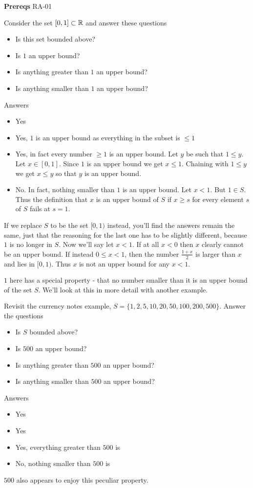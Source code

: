 

\textbf{Prereqs} RA-01

Consider the set $[0, 1] \subset \mathbb{R}$ and answer these questions
\begin{itemize}
	\item Is this set bounded above?
	\item Is $1$ an upper bound?
	\item Is anything greater than $1$ an upper bound?
	\item Is anything smaller than $1$ an upper bound?
\end{itemize}

Answers
\begin{itemize}
	\item Yes
	\item Yes, $1$ is an upper bound as everything in the subset is $\leq 1$
	\item Yes, in fact every number $\geq 1$ is an upper bound. Let $y$ be such that $1 \leq y$. Let $x \in [0, 1]$. Since $1$ is an upper bound we get $x \leq 1$. Chaining with $1 \leq y$ we get $x \leq y$ so that $y$ is an upper bound.
	\item No. In fact, nothing smaller than $1$ is an upper bound. Let $x < 1$. But $1 \in S$. Thus the definition that $x$ is an upper bound of $S$ if $x \geq s$ for every element $s$ of $S$ fails at $s = 1$.
\end{itemize}

If we replace $S$ to be the set $[0, 1)$ instead, you'll find the answers remain the same, just that the reasoning for the last one has to be slightly different, because $1$ is no longer in $S$. Now we'll say let $x < 1$. If at all $x < 0$ then $x$ clearly cannot be an upper bound. If instead $0 \leq x < 1$, then the number $\frac{1 + x}{2}$ is larger than $x$ and lies in $[0, 1)$. Thus $x$ is not an upper bound for any $x < 1$.

$1$ here has a special property - that no number smaller than it is an upper bound of the set $S$. We'll look at this in more detail with another example.

Revisit the currency notes example, $S = \{1, 2, 5, 10, 20, 50, 100, 200, 500\}$. Answer the questions
\begin{itemize}
	\item Is $S$ bounded above?
	\item Is $500$ an upper bound?
	\item Is anything greater than $500$ an upper bound?
	\item Is anything smaller than $500$ an upper bound? 
\end{itemize}
Answers
\begin{itemize}
	\item Yes
	\item Yes
	\item Yes, everything greater than $500$ is
	\item No, nothing smaller than $500$ is
\end{itemize}
$500$ also appears to enjoy this peculiar property.

